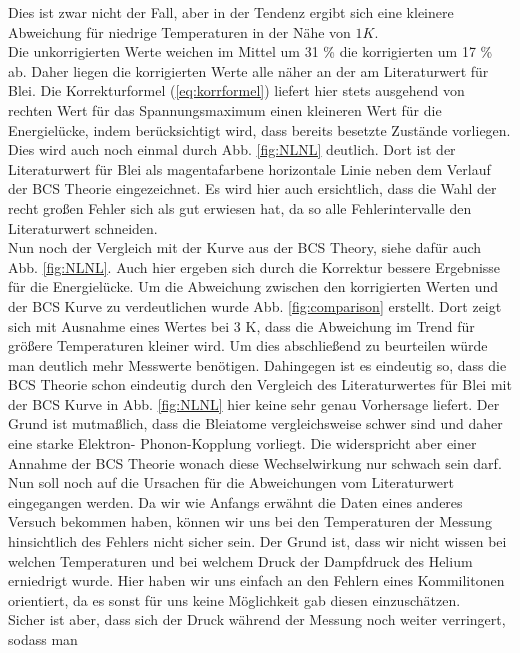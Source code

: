\documentclass[twoside,        %
               BCOR12mm,       %
               english,ngerman, %
               fleqn,headsepline=false,footsepline=false
              ]{MFPREPORT}
\begin{document}
Dies ist zwar nicht der Fall, aber in der Tendenz ergibt sich eine kleinere Abweichung für niedrige Temperaturen in der Nähe von $1 K.$
\\
Die unkorrigierten Werte weichen im Mittel um 31 
\% die korrigierten um 17 \% ab.
Daher liegen die korrigierten Werte alle näher an der am Literaturwert für Blei. 
Die Korrekturformel (\ref{eq:korrformel}) liefert hier stets ausgehend von rechten Wert für das Spannungsmaximum
einen kleineren Wert für die Energielücke, indem berücksichtigt wird, dass bereits besetzte Zustände vorliegen. 
\\
Dies wird auch noch einmal durch Abb. \ref{fig:NLNL} deutlich.
Dort ist der Literaturwert für Blei als magentafarbene horizontale Linie neben dem Verlauf der BCS Theorie eingezeichnet.
Es wird hier auch ersichtlich, dass die Wahl der recht großen Fehler sich als gut erwiesen hat, da so alle Fehlerintervalle den Literaturwert schneiden.
\\
Nun noch der Vergleich mit der Kurve aus der BCS Theory, siehe dafür auch Abb. \ref{fig:NLNL}.
Auch hier ergeben sich durch die Korrektur bessere Ergebnisse für die Energielücke.
Um die Abweichung zwischen den korrigierten Werten und der BCS Kurve zu verdeutlichen wurde Abb. \ref{fig:comparison} erstellt. 
Dort zeigt sich mit Ausnahme eines Wertes bei 3 K, dass die Abweichung im Trend für größere Temperaturen kleiner wird. Um dies abschließend zu beurteilen würde man deutlich mehr Messwerte benötigen.
Dahingegen ist es eindeutig so, dass die BCS Theorie schon eindeutig durch den Vergleich des Literaturwertes für Blei mit der BCS Kurve in Abb. \ref{fig:NLNL} hier keine sehr genau Vorhersage liefert.
Der Grund ist mutmaßlich, dass die Bleiatome vergleichsweise schwer sind und daher eine starke
Elektron- Phonon-Kopplung vorliegt.
Die widerspricht aber einer Annahme der BCS Theorie wonach diese Wechselwirkung nur schwach
sein darf.
\\
Nun soll noch auf die Ursachen für die Abweichungen vom Literaturwert eingegangen werden.
Da wir wie Anfangs erwähnt die Daten eines anderes Versuch bekommen haben, können wir uns
bei den Temperaturen der Messung hinsichtlich des Fehlers nicht sicher sein.
Der Grund ist, dass wir nicht wissen bei welchen Temperaturen und bei welchem Druck der 
Dampfdruck des Helium erniedrigt wurde.
Hier haben wir uns einfach an den Fehlern eines Kommilitonen orientiert, da es sonst für uns keine Möglichkeit gab diesen einzuschätzen. 
\\
Sicher ist aber, dass sich der Druck während der Messung noch weiter verringert, sodass man 
\end{document}
